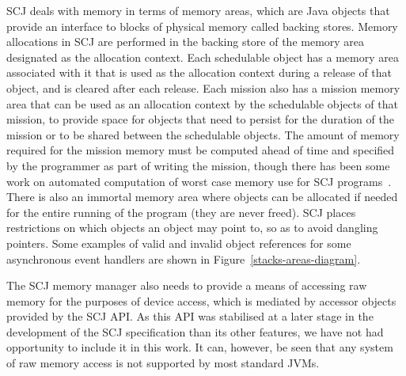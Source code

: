 SCJ deals with memory in terms of memory areas, which are Java objects
that provide an interface to blocks of physical memory called backing
stores.
Memory allocations in SCJ are performed in the backing store of the
memory area designated as the allocation context.
Each schedulable object has a memory area associated with it that is
used as the allocation context during a release of that object, and is
cleared after each release.
Each mission also has a mission memory area that can be used as an
allocation context by the schedulable objects of that mission, to
provide space for objects that need to persist for the duration of the
mission or to be shared between the schedulable objects.
The amount of memory required for the mission memory must be computed
ahead of time and specified by the programmer as part of writing the
mission, though there has been some work on automated computation of
worst case memory use for SCJ programs~\cite{andersen2013}.
There is also an immortal memory area where objects can be allocated
if needed for the entire running of the program (they are never
freed).
SCJ places restrictions on which objects an object may point to, so as
to avoid dangling pointers.
Some examples of valid and invalid object references for some
asynchronous event handlers are shown in
Figure~\ref{stacks-areas-diagram}.

The SCJ memory manager also needs to provide a means of accessing raw
memory for the purposes of device access, which is mediated by
accessor objects provided by the SCJ API.
As this  API was stabilised at a later stage in the
development of the SCJ specification than its other features, we have
not had opportunity to include it in this work.
It can, however, be seen that any system of raw memory access is not
supported by most standard JVMs.

